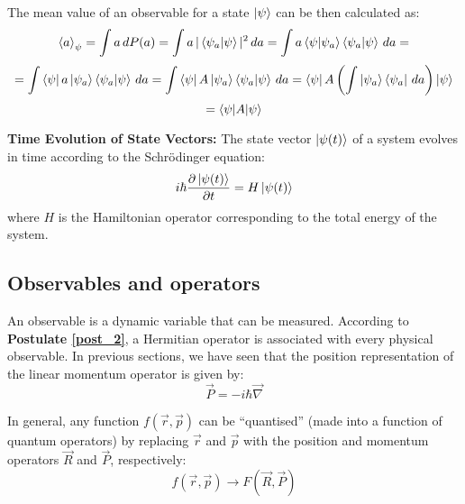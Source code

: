 \begin{postulate}
\begin{itemize}
        The mean value of an observable for a state $\ket{\psi}$ can be then calculated as:
        \begin{equation*}
            \braket{a}_\psi = \int a\, dP(a) = \int a\,|\braket{\psi_a|\psi}|^2\,da = \int a\braket{\psi|\psi_a}\braket{\psi_a|\psi}\,da = 
        \end{equation*}
        \begin{equation*}
            = \int \bra{\psi}a\ket{\psi_a}\braket{\psi_a|\psi}\,da = \int \bra{\psi}A\ket{\psi_a}\braket{\psi_a|\psi}\,da = \bra{\psi}A\left(\int\ket{\psi_a}\bra{\psi_a}\,da\right)\ket{\psi}
        \end{equation*}
        \begin{equation}
            = \braket{\psi|A|\psi}
        \end{equation}

    \end{itemize}
\end{postulate}

\begin{postulate} \label{post_5}
    \textbf{Time Evolution of State Vectors:} The state vector $\ket{\psi(t)}$ of a system evolves in time according to the Schrödinger equation:
    \begin{equation}
        i\hbar\frac{\partial \ket{\psi(t)}}{\partial t} = H\ket{\psi(t)}
    \end{equation}
    where $H$ is the Hamiltonian operator corresponding to the total energy of the system.
\end{postulate}

\subsection{Observables and operators} \label{observables_and_operators}

An observable is a dynamic variable that can be measured. According to \textbf{Postulate \ref{post_2}}, a Hermitian operator is associated with every physical observable. In previous sections, we have seen that the position representation of the linear momentum operator is given by:
\begin{equation}
    \vec{P} = -i\hbar\vec{\nabla}
\end{equation}

In general, any function $f(\vec{r}, \vec{p})$ can be ``quantised'' (made into a function of quantum operators) by replacing $\vec{r}$ and $\vec{p}$ with the position and momentum operators $\vec{R}$ and $\vec{P}$, respectively:
\begin{equation}
    f(\vec{r}, \vec{p}) \rightarrow F(\vec{R}, \vec{P})
\end{equation}

